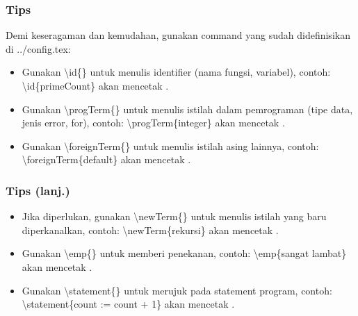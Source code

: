 \begin{frame}
\frametitle{Tips}
Demi keseragaman dan kemudahan, gunakan command yang sudah didefinisikan di ../config.tex:
\begin{itemize}
  \item Gunakan \textbackslash id\{\} untuk menulis identifier (nama fungsi, variabel), contoh: \textbackslash id\{primeCount\} akan mencetak .
  \item Gunakan \textbackslash progTerm\{\} untuk menulis istilah dalam pemrograman (tipe data, jenis error, for), contoh: \textbackslash progTerm\{integer\} akan mencetak .
  \item Gunakan \textbackslash foreignTerm\{\} untuk menulis istilah asing lainnya, contoh: \textbackslash foreignTerm\{default\} akan mencetak .
\end{itemize}
\end{frame}

\begin{frame}
\frametitle{Tips (lanj.)}
\begin{itemize}
  \item Jika diperlukan, gunakan \textbackslash newTerm\{\} untuk menulis istilah yang baru diperkanalkan, contoh: \textbackslash newTerm\{rekursi\} akan mencetak .
  \item Gunakan \textbackslash emp\{\} untuk memberi penekanan, contoh: \textbackslash emp\{sangat lambat\} akan mencetak .
  \item Gunakan \textbackslash statement\{\} untuk merujuk pada statement program, contoh: \textbackslash statement\{count := count + 1\} akan mencetak .
\end{itemize}
\end{frame}

